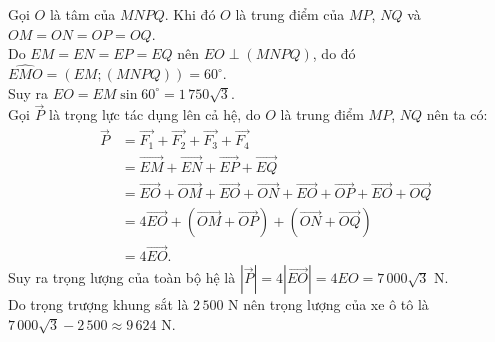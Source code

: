 \begin{bt}
{{
 }
Gọi $O$ là tâm của $MNPQ$. Khi đó $O$ là trung điểm của  $MP$, $NQ$ và $OM = ON = OP = OQ$.\\
Do $EM = EN = EP =EQ$ nên $EO \perp (MNPQ)$, do  đó $\widehat{EMO} = \left(EM;(MNPQ)\right) = 60^\circ$.\\
Suy ra $EO = EM \sin  60^\circ = 1\,750\sqrt{3}$.\\
Gọi $\overrightarrow{P}$ là trọng lực tác dụng lên cả hệ, do $O$  là trung điểm $MP$, $NQ$ nên ta có:
\begin{eqnarray*}
	& \overrightarrow{P}  & = \overrightarrow{F_1}+\overrightarrow{F_2}+\overrightarrow{F_3}+\overrightarrow{F_4}\\
	& & = \overrightarrow{EM } + \overrightarrow{EN} + \overrightarrow{EP} + \overrightarrow{EQ}\\ 
	 & & = \overrightarrow{EO} + \overrightarrow{OM} + \overrightarrow{EO} + \overrightarrow{ON} + \overrightarrow{EO} + \overrightarrow{OP} + \overrightarrow{EO} + \overrightarrow{OQ}\\
	& & = 4\overrightarrow{EO} + \left(\overrightarrow{OM} + \overrightarrow{OP}\right)  + \left(\overrightarrow{ON} + \overrightarrow{OQ}\right)\\
	& & = 4\overrightarrow{EO}. 
\end{eqnarray*}
Suy ra trọng lượng của toàn bộ hệ là $\left| \overrightarrow{P} \right|  = 4\left| \overrightarrow{EO}\right| = 4EO = 7\,000\sqrt{3}$ N.\\
Do trọng trượng khung sắt là $2\,500$ N nên trọng lượng của xe ô tô là $7\,000\sqrt{3}  - 2\,500 \approx 9\,624$ N.
} 
\end{bt}

